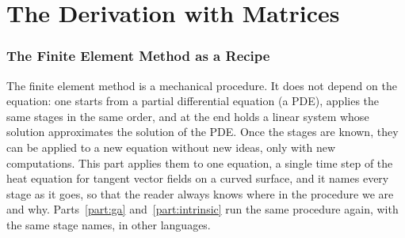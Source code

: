 \part{The Derivation with Matrices}
\label{part:matrix}

\section{The Finite Element Method as a Recipe}
\label{section:r1_recipe}

The finite element method is a mechanical procedure. It does not depend on the equation: one starts from a partial differential equation (a PDE), applies the same stages in the same order, and at the end holds a linear system whose solution approximates the solution of the PDE. Once the stages are known, they can be applied to a new equation without new ideas, only with new computations. This part applies them to one equation, a single time step of the heat equation for tangent vector fields on a curved surface, and it names every stage as it goes, so that the reader always knows where in the procedure we are and why. Parts~\ref{part:ga} and~\ref{part:intrinsic} run the same procedure again, with the same stage names, in other languages.

